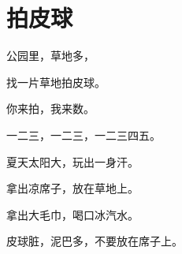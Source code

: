 \documentclass[12pt,UTF-8,openany]{ctexbook}
\begin{document}
\clearpage

\begin{center}
    
\end{center}


\hanzibox{}\hanzibox{}\hanzibox{}\hanzibox{}\hspace{1em}\hanzibox{}\hanzibox{}\hanzibox{}\hanzibox{}

\hanzibox{}\hanzibox{}\hanzibox{}\hanzibox{}\hspace{1em}\hanzibox{}\hanzibox{}\hanzibox{}\hanzibox{}

\hanzibox{}\hanzibox{}\hanzibox{}\hanzibox{}\hspace{1em}




\chapter{拍皮球}

\begin{large}
    
    公园里，草地多，
    
    找一片草地拍皮球。
    
    你来拍，我来数。
    
    一二三，一二三，一二三四五。
    
    夏天太阳大，玩出一身汗。
    
    拿出凉席子，放在草地上。
    
    拿出大毛巾，喝口冰汽水。
    
    皮球脏，泥巴多，不要放在席子上。
    
\end{large}


\clearpage

\begin{center}
    
\end{center}


\hanzibox{}\hanzibox{}\hanzibox{}\hanzibox{}\hspace{1em}\hanzibox{}\hanzibox{}\hanzibox{}\hanzibox{}

\hanzibox{}\hanzibox{}\hanzibox{}\hanzibox{}\hspace{1em}\hanzibox{}\hanzibox{}\hanzibox{}\hanzibox{}
\end{document}
